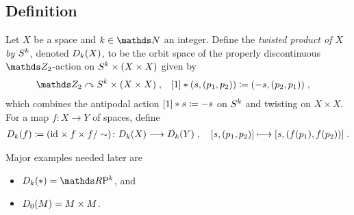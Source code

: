 \subsection{Definition}
\begin{Def}
  Let $X$ be a space and $k\in\Nat$ an integer.
  Define the \emph{twisted product of $X$ by $S^{k}$}, denoted
  $D_{k}({X})$, to be the orbit space of the properly
  discontinuous $\Zmod2$-action on $S^{k}\times(X\times X)$ given
  by
  \begin{align*}
    \Zmod2 &\leftgroupaction \Twistedprodcovspace{k}{X}
             \;,
    &[1] \actson (s, (p_1,p_2)) &\coloneqq (-s, (p_2, p_1))
                                \;,
  \end{align*}
  which combines the antipodal action $[1]\ast s\coloneqq -s$ on
  $S^{k}$ and twisting on $X\times X$.
  For a map $f\colon X\to Y$ of spaces, define
  \begin{gather*}
    D_{k}({f})\coloneqq (\mathrm{id}_{}\times f\times f/\sim)\colon
    D_{k}({X})\longrightarrow D_{k}({Y})
    \;,\quad
    [s,(p_1,p_2)] \longmapsto [s,(f(p_1),f(p_2))]
    \;.
  \end{gather*}
\end{Def}
\begin{Ex}
  Major examples needed later are
  \begin{itemize}
  \item $\Twistedprod k {\pt} = \RP k$, and
  \item $D_{0}({M}) = M\times M$.
  \end{itemize}
\end{Ex}

